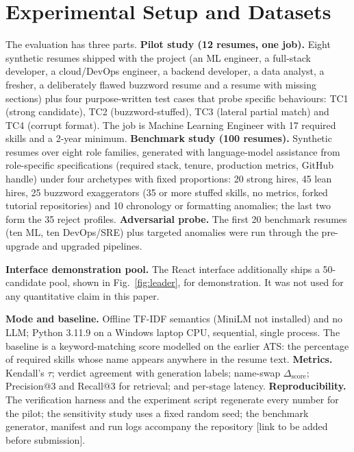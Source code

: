 \documentclass[conference]{IEEEtran}
\begin{document}
\section{Experimental Setup and Datasets}
\label{sec:exp}
The evaluation has three parts. \textbf{Pilot study (12 resumes, one job).} Eight synthetic resumes shipped with the project (an ML engineer, a full-stack developer, a cloud/DevOps engineer, a backend developer, a data analyst, a fresher, a deliberately flawed buzzword resume and a resume with missing sections) plus four purpose-written test cases that probe specific behaviours: TC1 (strong candidate), TC2 (buzzword-stuffed), TC3 (lateral partial match) and TC4 (corrupt format). The job is Machine Learning Engineer with 17 required skills and a 2-year minimum. \textbf{Benchmark study (100 resumes).} Synthetic resumes over eight role families, generated with language-model assistance from role-specific specifications (required stack, tenure, production metrics, GitHub handle) under four archetypes with fixed proportions: 20 strong hires, 45 lean hires, 25 buzzword exaggerators (35 or more stuffed skills, no metrics, forked tutorial repositories) and 10 chronology or formatting anomalies; the last two form the 35 reject profiles. \textbf{Adversarial probe.} The first 20 benchmark resumes (ten ML, ten DevOps/SRE) plus targeted anomalies were run through the pre-upgrade and upgraded pipelines.

\textbf{Interface demonstration pool.} The React interface additionally ships a 50-candidate pool, shown in Fig.~\ref{fig:leader}, for demonstration. It was not used for any quantitative claim in this paper.

\textbf{Mode and baseline.} Offline TF-IDF semantics (MiniLM not installed) and no LLM; Python 3.11.9 on a Windows laptop CPU, sequential, single process. The baseline is a keyword-matching score modelled on the earlier ATS: the percentage of required skills whose name appears anywhere in the resume text. \textbf{Metrics.} Kendall's $\tau$; verdict agreement with generation labels; name-swap $\Delta_{\mathrm{score}}$; Precision@3 and Recall@3 for retrieval; and per-stage latency. \textbf{Reproducibility.} The verification harness and the experiment script regenerate every number for the pilot; the sensitivity study uses a fixed random seed; the benchmark generator, manifest and run logs accompany the repository [link to be added before submission].
\end{document}
